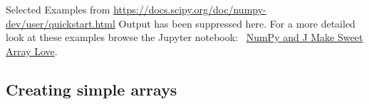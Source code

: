 Selected Examples from
\url{https://docs.scipy.org/doc/numpy-dev/user/quickstart.html} Output
has been suppressed here. For a more detailed look at these examples
browse the Jupyter notebook:~
\href{https://github.com/bakerjd99/jacks/blob/master/numpyjlove/NumPy\%20and\%20J\%20make\%20Sweet\%20Array\%20Love.ipynb}{NumPy
and J Make Sweet Array Love}.


\subsection*{Creating simple arrays}

